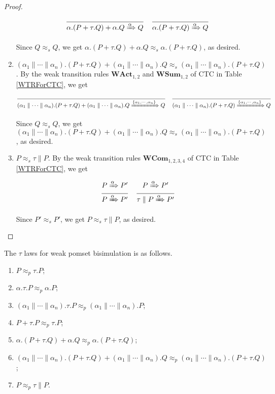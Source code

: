 \begin{proof}
\begin{enumerate}
  $$\frac{}{\alpha.(P+\tau.Q)+\alpha.Q\xRightarrow{\alpha}Q}
  \quad \frac{}{\alpha.(P+\tau.Q)\xRightarrow{\alpha} Q}$$

  Since $Q\approx_s Q$, we get $\alpha.(P+\tau.Q)+\alpha.Q\approx_s\alpha.(P+\tau.Q)$, as desired.
  \item $(\alpha_1\parallel\cdots\parallel\alpha_n).(P+\tau.Q)+ (\alpha_1\parallel\cdots\parallel\alpha_n).Q\approx_s (\alpha_1\parallel\cdots\parallel\alpha_n).(P+\tau.Q)$. By the weak transition rules $\textbf{WAct}_{1,2}$ and $\textbf{WSum}_{1,2}$ of CTC in Table \ref{WTRForCTC}, we get

  $$\frac{}{(\alpha_1\parallel\cdots\parallel\alpha_n).(P+\tau.Q)+(\alpha_1\parallel\cdots\parallel\alpha_n).Q \xRightarrow{\{\alpha_1,\cdots,\alpha_n\}}Q}
  \quad \frac{}{(\alpha_1\parallel\cdots\parallel\alpha_n).(P+\tau.Q)\xRightarrow{\{\alpha_1,\cdots,\alpha_n\}} Q}$$

  Since $Q\approx_s Q$, we get $(\alpha_1\parallel\cdots\parallel\alpha_n).(P+\tau.Q)+ (\alpha_1\parallel\cdots\parallel\alpha_n).Q\approx_s(\alpha_1\parallel\cdots\parallel\alpha_n).(P+\tau.Q)$, as desired.
  \item $P\approx_s \tau\parallel P$. By the weak transition rules $\textbf{WCom}_{1,2,3,4}$ of CTC in Table \ref{WTRForCTC}, we get

  $$\frac{P\xRightarrow{\alpha}P'}{P\xRightarrow{\alpha}P'}
  \quad \frac{P\xRightarrow{\alpha}P'}{\tau\parallel P\xRightarrow{\alpha} P'}$$

  Since $P'\approx_s P'$, we get $P\approx_s \tau\parallel P$, as desired.
\end{enumerate}
\end{proof}

\begin{proposition}\label{TAUWPB}
The $\tau$ laws for weak pomset bisimulation is as follows.
\begin{enumerate}
  \item $P\approx_p \tau.P$;
  \item $\alpha.\tau.P\approx_p \alpha.P$;
  \item $(\alpha_1\parallel\cdots\parallel\alpha_n).\tau.P\approx_p (\alpha_1\parallel\cdots\parallel\alpha_n).P$;
  \item $P+\tau.P\approx_p \tau.P$;
  \item $\alpha.(P+\tau.Q)+\alpha.Q\approx_p\alpha.(P+\tau.Q)$;
  \item $(\alpha_1\parallel\cdots\parallel\alpha_n).(P+\tau.Q)+ (\alpha_1\parallel\cdots\parallel\alpha_n).Q\approx_p (\alpha_1\parallel\cdots\parallel\alpha_n).(P+\tau.Q)$;
  \item $P\approx_p \tau\parallel P$.
\end{enumerate}
\end{proposition}

